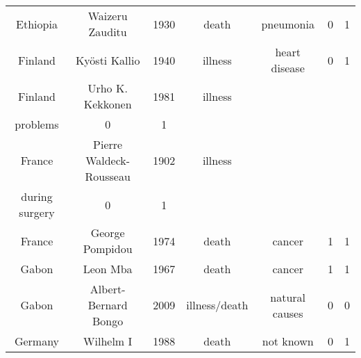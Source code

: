 \begin{center}
\begin{longtable}{ccccccc}
Ethiopia                                                                   & Waizeru Zauditu                                                                       & 1930       & death         & pneumonia                                                              & 0        & 1       \\
Finland                                                                    & Kyösti Kallio                                                                         & 1940       & illness       & heart disease                                                          & 0        & 1       \\
Finland                                                                    & Urho K. Kekkonen                                                                      & 1981       & illness       & \begin{tabular}[c]{@{}c@{}}circulatory\\ problems\end{tabular}         & 0        & 1       \\
France                                                                     & Pierre Waldeck-Rousseau                                                               & 1902       & illness       & \begin{tabular}[c]{@{}c@{}}complications\\ during surgery\end{tabular} & 0        & 1       \\
France                                                                     & George Pompidou                                                                       & 1974       & death         & cancer                                                                 & 1        & 1       \\
Gabon                                                                      & Leon Mba                                                                              & 1967       & death         & cancer                                                                 & 1        & 1       \\
Gabon                                                                      & Albert-Bernard Bongo                                                                  & 2009       & illness/death & natural causes                                                         & 0        & 0       \\
Germany                                                                    & Wilhelm I                                                                             & 1988       & death         & not known                                                              & 0        & 1       \\

\end{longtable}
\end{center}
